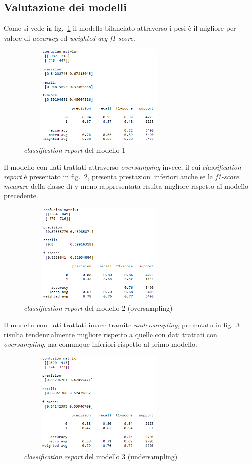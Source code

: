 \documentclass{article}
\begin{document}
\subsection{Valutazione dei modelli}
Come si vede in fig.~\ref{fig: model1} il modello bilanciato attraverso i pesi è il migliore per valore di \textit{accuracy} ed \textit{weighted avg f1-score}. 
\begin{figure}%
\centering	\includegraphics[width=80mm, height=50mm]{imgs/cr_model1.png}
	\caption{\label{fig: model1} \textit{classification report} del modello 1}
\end{figure}
Il modello con dati trattati attraverso \textit{oversampling} invece, il cui \textit{classification report} è presentato in fig.~\ref{fig: model2}, presenta prestazioni inferiori anche se la \textit{f1-score measure} della classe di y meno rappresentata risulta migliore rispetto al modello precedente.
\begin{figure}%
\centering	\includegraphics[width=80mm, height=50mm]{imgs/cr_model2.png}
	\caption{\label{fig: model2} \textit{classification report} del modello 2 (oversampling)}
\end{figure}
Il modello con dati trattati invece tramite \textit{undersampling}, presentato in fig.~\ref{fig: model3} risulta tendenzialmente migliore rispetto a quello con dati trattati con \textit{oversampling}, ma comunque inferiori rispetto al primo modello.
\begin{figure}%
\centering	\includegraphics[width=80mm, height=50mm]{imgs/cr_model3.png}
	\caption{\label{fig: model3} \textit{classification report} del modello 3 (undersampling)}
\end{figure}
\end{document}
